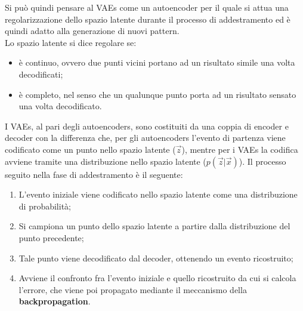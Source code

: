 Si può quindi pensare al VAEs come un autoencoder per il quale si attua una regolarizzazione dello spazio latente durante il processo di addestramento ed è quindi adatto alla generazione di nuovi pattern. \\
Lo spazio latente si dice regolare se:
\begin{itemize}
	\item è continuo, ovvero due punti vicini portano ad un risultato simile una volta decodificati;
	\item è completo, nel senso che un qualunque punto porta ad un risultato sensato una volta decodificato.  
\end{itemize}
I VAEs, al pari degli autoencoders, sono costituiti da una coppia di encoder e decoder con la differenza che, per gli autoencoders l'evento di partenza viene codificato come un punto nello spazio latente ($\vec{z}$), mentre per i VAEs la codifica avviene tramite una distribuzione nello spazio latente ($p(\vec{z}|\vec{x})$). Il processo seguito nella fase di addestramento è il seguente:
\begin{enumerate}
	\item L'evento iniziale viene codificato nello spazio latente come una distribuzione di probabilità;
	\item Si campiona un punto dello spazio latente a partire dalla distribuzione del punto precedente;
	\item Tale punto viene decodificato dal decoder, ottenendo un evento ricostruito;
	\item Avviene il confronto fra l'evento iniziale e quello ricostruito da cui si calcola l'errore, che viene poi propagato mediante il meccanismo della \textbf{backpropagation}.
\end{enumerate}

